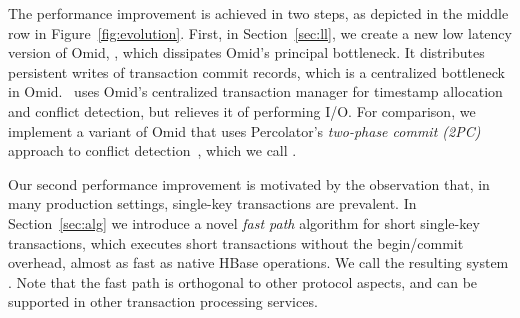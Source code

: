 The performance  improvement  is achieved in two steps, as depicted in the middle row in  Figure~\ref{fig:evolution}.  
First, in Section~\ref{sec:ll}, we create a new low latency version of Omid, \sysll, which
dissipates Omid's principal bottleneck. It  
distributes persistent writes of transaction commit records, which is a centralized bottleneck in Omid. 
\sysll\ uses Omid's centralized transaction manager for timestamp allocation and conflict detection, 
but relieves it of performing I/O. 
%
For comparison, we implement a variant of Omid that uses Percolator's \emph{two-phase commit (2PC)} approach to 
conflict detection~\cite{Percolator2010}, which we call \syspc. 

Our second performance improvement is motivated by the observation that, in many production settings, single-key transactions are prevalent.  
In Section~\ref{sec:alg} we introduce a novel \emph{fast path} algorithm for short single-key transactions, which 
executes short transactions without the begin/commit overhead,  almost as fast as native HBase operations. 
We call the resulting system \sys. 
Note that the fast path is orthogonal to other protocol aspects, and can be supported in other 
transaction processing services. 

 
